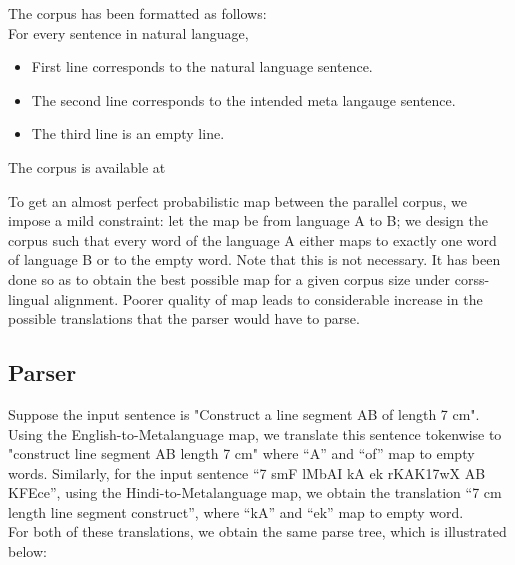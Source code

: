 \def\DevnagVersion{2.15}\documentclass[12pt]{article}
\begin{document}
The corpus has been formatted as follows:\\
For every sentence in natural language, 
\begin{itemize}
\item First line corresponds to the natural language sentence.
\item The second line corresponds to the intended meta langauge sentence.
\item The third line is an empty line.
\end{itemize}
The corpus is available at \cite{corpus}

To get an almost perfect probabilistic map between the parallel corpus, we impose a mild constraint: let the map be from language A to B; we design the corpus such that every word of the language A either maps to exactly one word of language B or to the empty word. Note that this is not necessary. It has been done so as to obtain the best possible map for a given corpus size under corss-lingual alignment. Poorer quality of map leads to considerable increase in the possible translations that the parser would have to parse.

\subsection{Parser}
Suppose the input sentence is "Construct a line segment AB of length 7 cm". Using the English-to-Metalanguage map, we translate this sentence tokenwise to "construct line segment AB length 7 cm" where ``A'' and ``of'' map to empty words. Similarly, for the input sentence ``7 {\dn s\?mF lMbAI kA ek r\?KAK\317wX} AB {\dn KF{\qva}Ece}'', using the Hindi-to-Metalanguage map, we obtain the translation ``7 cm length line segment construct'', where ``{\dn kA}'' and ``{\dn ek}'' map to empty word.\\

For both of these translations, we obtain the same parse tree, which is illustrated below:
\end{document}
